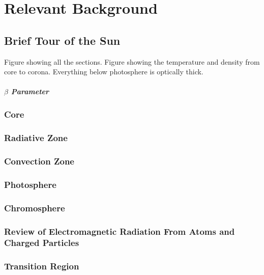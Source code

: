 \chapter{Relevant Background}
\label{chapterbackground}

\section{Brief Tour of the Sun}
Figure showing all the sections. 
Figure showing the temperature and density from core to corona. 
Everything below photosphere is optically thick. 

\paragraph{$\beta$ Parameter}

\subsection{Core}

\subsection{Radiative Zone}

\subsection{Convection Zone}

\subsection{Photosphere}

\subsection{Chromosphere}

\subsection{Review of Electromagnetic Radiation From Atoms and Charged Particles}

\subsection{Transition Region}

